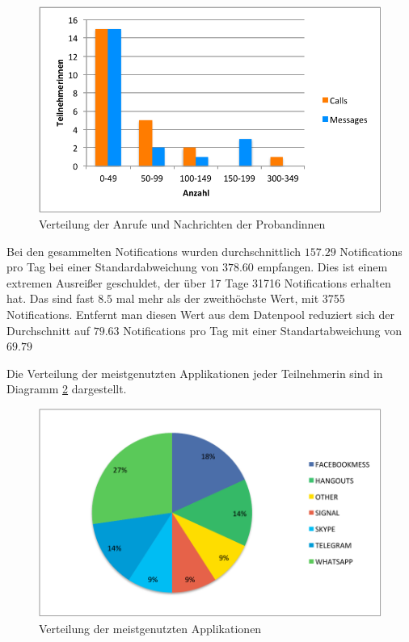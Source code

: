 \begin{figure}[h]
    \centering
    \includegraphics{images/callsMessagesDistr.pdf}
    \caption{Verteilung der Anrufe und Nachrichten der Probandinnen}
    \label{fig:callmessagesdistr}
\end{figure}


Bei den gesammelten Notifications wurden durchschnittlich $157.29$ Notifications pro Tag bei einer Standardabweichung von $378.60$ empfangen.
Dies ist einem extremen Ausreißer geschuldet, der über 17 Tage 31716 Notifications erhalten hat. 
Das sind fast $8.5$ mal mehr als der zweithöchste Wert, mit 3755 Notifications.
Entfernt man diesen Wert aus dem Datenpool reduziert sich der Durchschnitt auf $79.63$ Notifications pro Tag mit einer Standartabweichung von $69.79$
\par
Die Verteilung der meistgenutzten Applikationen jeder Teilnehmerin sind in Diagramm \ref{fig:mostusedapp} dargestellt.

\begin{figure}[h]
    \centering
    \includegraphics{images/MostUsedApp.pdf}
    \caption{Verteilung der meistgenutzten Applikationen}
    \label{fig:mostusedapp}
\end{figure}

